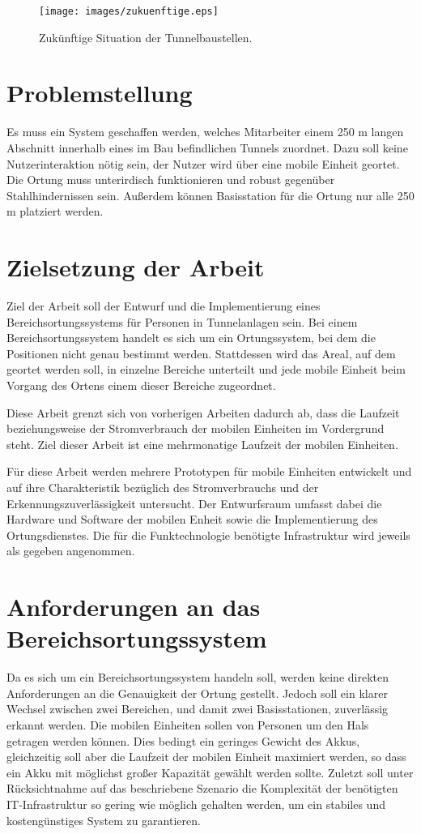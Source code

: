 \begin{figure}[h]
  \centering
	\texttt{[image: images/zukuenftige.eps]}
  \caption{Zukünftige Situation der Tunnelbaustellen.}
  \label{fig:zukuenftige}
\end{figure}

\section{Problemstellung}
Es muss ein System geschaffen werden, welches Mitarbeiter einem 250 m langen Abschnitt innerhalb eines im Bau befindlichen Tunnels zuordnet.
Dazu soll keine Nutzerinteraktion nötig sein, der Nutzer wird über eine mobile Einheit geortet.
Die Ortung muss unterirdisch funktionieren und robust gegenüber Stahlhindernissen sein.
Außerdem können Basisstation für die Ortung nur alle 250 m platziert werden.


\section{Zielsetzung der Arbeit}
\label{ch:Einleitung:sec:Zielsetzung}
Ziel der Arbeit soll der Entwurf und die Implementierung eines Bereichsortungssystems für Personen in Tunnelanlagen sein. 
Bei einem Bereichsortungssystem handelt es sich um ein Ortungssystem, bei dem die Positionen nicht genau bestimmt werden. 
Stattdessen wird das Areal, auf dem geortet werden soll, in einzelne Bereiche unterteilt und jede mobile Einheit beim Vorgang des Ortens einem dieser Bereiche zugeordnet.

Diese Arbeit grenzt sich von vorherigen Arbeiten dadurch ab, dass die Laufzeit beziehungsweise der Stromverbrauch der mobilen Einheiten im Vordergrund steht. 
Ziel dieser Arbeit ist eine mehrmonatige Laufzeit der mobilen Einheiten. 

Für diese Arbeit werden mehrere Prototypen für mobile Einheiten entwickelt und auf ihre Charakteristik bezüglich des Stromverbrauchs und der Erkennungszuverlässigkeit untersucht.
Der Entwurfsraum umfasst dabei die Hardware und Software der mobilen Enheit sowie die Implementierung des Ortungsdienstes. 
Die für die Funktechnologie benötigte Infrastruktur wird jeweils als gegeben angenommen.


\section{Anforderungen an das Bereichsortungssystem}
\label{ch:Einleitung:sec:Anforderungen}
Da es sich um ein Bereichsortungssystem handeln soll, werden keine direkten Anforderungen an die Genauigkeit der Ortung gestellt. 
Jedoch soll ein klarer Wechsel zwischen zwei Bereichen, und damit zwei Basisstationen, zuverlässig erkannt werden. 
Die mobilen Einheiten sollen von Personen um den Hals getragen werden können. 
Dies bedingt ein geringes Gewicht des Akkus, gleichzeitig soll aber die Laufzeit der mobilen Einheit maximiert werden, so dass ein Akku mit möglichst großer Kapazität gewählt werden sollte.
Zuletzt soll unter Rücksichtnahme auf das beschriebene Szenario die Komplexität der benötigten IT-Infrastruktur so gering wie möglich gehalten werden, um ein stabiles und kostengünstiges System zu garantieren. 



